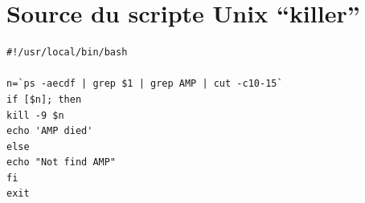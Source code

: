 \section{Source du scripte Unix ``killer''}
\label{ann:killer}
\begin{verbatim}
#!/usr/local/bin/bash

n=`ps -aecdf | grep $1 | grep AMP | cut -c10-15`
if [$n]; then 
kill -9 $n
echo 'AMP died'
else
echo "Not find AMP"
fi
exit
\end{verbatim}
